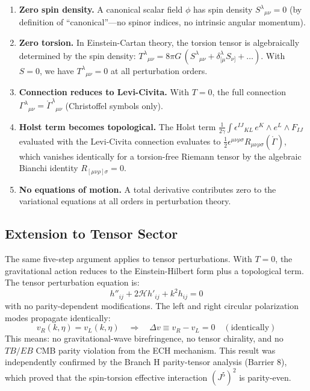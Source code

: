 \documentclass[aps,prd,twocolumn,superscriptaddress,showpacs,preprintnumbers,nofootinbib,longbibliography,floatfix]{revtex4-2}
\begin{document}
\begin{enumerate}
\item \textbf{Zero spin density.} A canonical scalar field $\phi$ has spin density $S^\lambda{}_{\mu\nu} = 0$ (by definition of ``canonical''---no spinor indices, no intrinsic angular momentum).

\item \textbf{Zero torsion.} In Einstein-Cartan theory, the torsion tensor is algebraically determined by the spin density: $T^\lambda{}_{\mu\nu} = 8\pi G\, (S^\lambda{}_{\mu\nu} + \delta^\lambda_{[\mu} S_{\nu]} + \ldots)$. With $S = 0$, we have $T^\lambda{}_{\mu\nu} = 0$ at all perturbation orders.

\item \textbf{Connection reduces to Levi-Civita.} With $T = 0$, the full connection $\Gamma^\lambda{}_{\mu\nu} = \mathring{\Gamma}^\lambda{}_{\mu\nu}$ (Christoffel symbols only).

\item \textbf{Holst term becomes topological.} The Holst term $\frac{1}{2\gamma}\int \epsilon^{IJ}{}_{KL}\, e^K \wedge e^L \wedge F_{IJ}$ evaluated with the Levi-Civita connection evaluates to $\frac{1}{2}\epsilon^{\mu\nu\rho\sigma}R_{\mu\nu\rho\sigma}(\mathring{\Gamma})$, which vanishes identically for a torsion-free Riemann tensor by the algebraic Bianchi identity $R_{[\mu\nu\rho]\sigma} = 0$.

\item \textbf{No equations of motion.} A total derivative contributes zero to the variational equations at all orders in perturbation theory.
\end{enumerate}

\subsection{Extension to Tensor Sector}

The same five-step argument applies to tensor perturbations. With $T = 0$, the gravitational action reduces to the Einstein-Hilbert form plus a topological term. The tensor perturbation equation is:
\begin{equation}
h''_{ij} + 2\mathcal{H}h'_{ij} + k^2 h_{ij} = 0
\end{equation}
with no parity-dependent modifications. The left and right circular polarization modes propagate identically:
\begin{equation}
v_R(k,\eta) = v_L(k,\eta) \quad \Rightarrow \quad \Delta v \equiv v_R - v_L = 0 \quad (\text{identically})
\end{equation}
This means: no gravitational-wave birefringence, no tensor chirality, and no $TB/EB$ CMB parity violation from the ECH mechanism. This result was independently confirmed by the Branch H parity-tensor analysis (Barrier 8), which proved that the spin-torsion effective interaction $(J^5)^2$ is parity-even.
\end{document}
